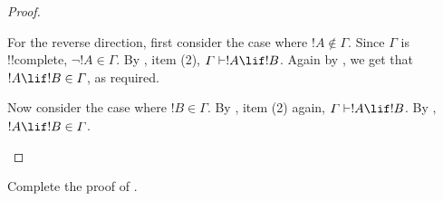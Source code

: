 \documentclass[../../../include/open-logic-section]{subfiles}
\begin{document}
\begin{proof}
\begin{enumerate}
{{For the reverse direction, first consider the case where $!A \notin
\Gamma$. Since $\Gamma$ is !!{complete}, $\lnot !A \in \Gamma$.  By
, item (2),
$\Gamma \Proves !A \lif !B$. Again by , we get
that $!A \lif !B \in \Gamma$, as required.

Now consider the case where $!B \in \Gamma$.  By
,
item (2) again, $\Gamma \Proves !A \lif !B$. By
, $!A \lif !B \in \Gamma$.}}
\end{enumerate}
\end{proof}

\begin{prob}
Complete the proof of .
\end{prob}
\end{document}
